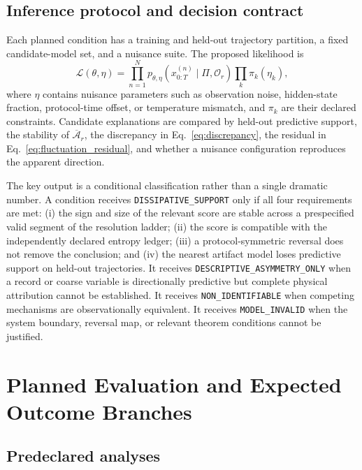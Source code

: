 \subsection{Inference protocol and decision contract}

Each planned condition has a training and held-out trajectory partition, a fixed candidate-model set, and a nuisance suite. The proposed likelihood is
\begin{equation}
\mathcal{L}(\theta,\eta)=\prod_{n=1}^{N}p_{\theta,\eta}\left(x^{(n)}_{0:T}\mid\Pi,\mathcal{O}_{r}\right)\prod_{k}\pi_k(\eta_k),
\label{eq:likelihood}
\end{equation}
where $\eta$ contains nuisance parameters such as observation noise, hidden-state fraction, protocol-time offset, or temperature mismatch, and $\pi_k$ are their declared constraints. Candidate explanations are compared by held-out predictive support, the stability of $\overline{\mathcal{A}}_r$, the discrepancy in Eq.~\eqref{eq:discrepancy}, the residual in Eq.~\eqref{eq:fluctuation_residual}, and whether a nuisance configuration reproduces the apparent direction.

The key output is a conditional classification rather than a single dramatic number. A condition receives \texttt{DISSIPATIVE\_SUPPORT} only if all four requirements are met: (i) the sign and size of the relevant score are stable across a prespecified valid segment of the resolution ladder; (ii) the score is compatible with the independently declared entropy ledger; (iii) a protocol-symmetric reversal does not remove the conclusion; and (iv) the nearest artifact model loses predictive support on held-out trajectories. It receives \texttt{DESCRIPTIVE\_ASYMMETRY\_ONLY} when a record or coarse variable is directionally predictive but complete physical attribution cannot be established. It receives \texttt{NON\_IDENTIFIABLE} when competing mechanisms are observationally equivalent. It receives \texttt{MODEL\_INVALID} when the system boundary, reversal map, or relevant theorem conditions cannot be justified.

\section{Planned Evaluation and Expected Outcome Branches}

\subsection{Predeclared analyses}

